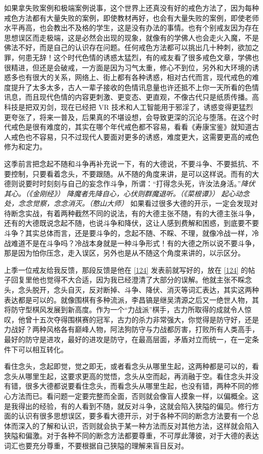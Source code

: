 如果拿失败案例和极端案例说事，这个世界上还真没有好的戒色方法了，因为每种戒色方法都有大量失败的案例，即使教材再好，也会有大量失败的案例，即使老师水平再高，也会教出不及格的学生，这是没有办法的事情。也有个别戒友因为存在思想误区而走极端，这是必然会出现的现象，就像有的学佛人也会走火入魔，不是佛法不好，而是自己的认识存在问题。任何戒色方法都可以挑出几十种刺，欲加之罪，何患无辞！这个时代色情的诱惑太猛烈，有的戒友看了很多戒色文章，学佛也很精进，但还是会破戒，一方面是因为习气太重，修心不到位，另外和大环境的诱惑多也有很大的关系，网络上、街上都有各种诱惑，相对古代而言，现代戒色的难度提升了太多太多，古人一辈子接收的色情讯息量也许还抵不上你一天所看的色情讯息，而且现代色情的内容更刺激、更变态、更直观，不像古代只是纸质传播。高科技是把双刃剑，现在已经把 VR 技术和人工智能用于邪淫了，诱惑变得更猛烈更夸张了，将来一普及，后果真的不堪设想，会导致更深的沉沦与堕落。在这个时代戒色是很有难度的，其实在哪个年代戒色都不容易，看看《寿康宝鉴》就知道古人戒色也不容易，只不过现代人要面对更多的诱惑，难度更大，这需要更高的戒色修为和定力。

这季前言把念起不随和斗争再补充说一下，有的大德说，不要斗争、不要抵抗、不要控制，只要看着念头，不要跟随。从不随的角度来讲，是可以这样说。而有的大德则说要时时刻刻与自己的妄念作斗争，所谓：“打得念头死，许汝法身活。”\textit{降伏其心。（《金刚经》）} \textit{降魔者先降自心，心伏则群魔退听。（《菜根谭》）} \textit{起心动念处，念念觉察，念念消灭。（憨山大师）} 如果看过很多大德的开示，一定会发现对待断念实战，有着两种截然不同的说法，有的大德主张不随，有的大德主张斗争，还有的大德既说念起不随，也说斗争和降伏，这让人感到费解和困惑，到底要不要斗争？其实总体而言，还是要斗争的，念起不随、不睬、不理，就像冷战一样，冷战难道不是在斗争吗？冷战本身就是一种斗争形式！有的大德之所以说不要斗争，那是因为怕你压念，走入误区，另外也是从不随这个角度来讲的，以示区分。

上季一位戒友给我反馈，那段反馈是他在 \ref{124} 发表前就写好的，放在 \ref{124} 的帖子回复里他也觉得不大合适，因为我已经澄清了大部分的误解。他就主张不睬念头，念头脱开，念头自灭，反对断掉、斗争、降伏、消灭等词汇表达，其实这两种表达都是可以的。就像围棋有多种流派，李昌镐是继吴清源之后又一绝世人物，其将防守型棋风发展到新高度。作为一个“力战派”棋手，古力所取得的成就令人惊叹，他曾十五次夺得围棋赛的冠军，古力的杀力非常强大，你觉得是防守好，还是力战好？两种风格各有巅峰人物，阿法狗防守与力战都厉害，打败所有人类高手，最好的防守是进攻，最好的进攻是防守，在最高层面，矛盾对立而统一，在一定条件下可以相互转化。

看住念头，念起即觉，觉之即无，或者看念头从哪里生起，这两种都是可以的，看念头从哪里生起，这要求更高的觉悟，念头从空而起，再消融于空。看住念头并没有错，很多大德都说要看住念头，而看念头从哪里生起，也没有错，两种不同的修心方法而已。看问题一定要完整而全面，否则就会像盲人摸象一样，以偏概全。这是我得出的经验，有的人看到不随，就反对斗争，这就会陷入狭隘的偏见。修行方面的认识有很多思想误区，要多看大德开示，对于各种不同的断念方法要有一个总体而深入的了解和认识，否则就会执于某一种方法而反对其他方法，这样就会陷入狭隘和偏激。对于各种不同的断念方法都要尊重，不可厚此薄彼，对于大德的表达词汇也要充分尊重，不要根据自己狭隘的理解来盲目反对。

